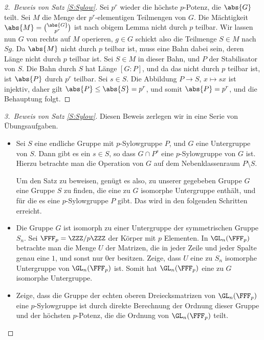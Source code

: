 \documentclass[12pt,a4paper,twoside]{article}
\begin{document}
\begin{proof}[2.\ Beweis von Satz \ref{S:Sylow}]
  Sei $p^r$ wieder die h\"ochste $p$-Potenz, die $\abs{G}$ teilt. Sei $M$ die
  Menge der $p^r$-elementigen Teilmengen von $G$. Die M\"achtigkeit
  $\abs{M}=\binom{\abs{G}}{p^r}$ ist nach obigem Lemma nicht durch $p$
  teilbar. Wir lassen nun $G$ von rechts auf $M$ operieren, $g\in G$ schickt
  also die Teilmenge $S\in M$ nach $Sg$. Da $\abs{M}$ nicht durch $p$ teilbar
  ist, muss eine Bahn dabei sein, deren L\"ange nicht durch $p$ teilbar ist.
  Sei $S\in M$ in dieser Bahn, und $P$ der Stabilisator von $S$. Die Bahn
  durch $S$ hat L\"ange $[G:P]$, und da das nicht durch $p$ teilbar ist, ist
  $\abs{P}$ durch $p^r$ teilbar. Sei $s\in S$. Die Abbildung $P\to S$,
  $x\mapsto sx$ ist injektiv, daher gilt $\abs{P}\le\abs{S}=p^r$, und somit
  $\abs{P}=p^r$, und die Behauptung folgt.
\end{proof}
\begin{proof}[3.\ Beweis von Satz \ref{S:Sylow}]
  Diesen Beweis zerlegen wir in eine Serie von \"Ubungsaufgaben.
  \begin{itemize}
  \item[(a)] Sei $S$ eine endliche Gruppe mit $p$-Sylowgruppe $P$, und $G$
    eine Untergruppe von $S$. Dann gibt es ein $s\in S$, so dass $G\cap P^s$
    eine $p$-Sylowgruppe von $G$ ist. Hierzu betrachte man die Operation von
    $G$ auf dem Nebenklassenraum $P\setminus S$.
    
    Um den Satz zu beweisen, gen\"ugt es also, zu unserer gegebeben Gruppe $G$
    eine Gruppe $S$ zu finden, die eine zu $G$ isomorphe Untergruppe
    enth\"alt, und f\"ur die es eine $p$-Sylowgruppe $P$ gibt. Das wird in den
    folgenden Schritten erreicht.
    
  \item[(b)] Die Gruppe $G$ ist isomorph zu einer Untergruppe der
    symmetrischen Gruppe $S_n$. Sei $\FFF_p=\ZZZ/p\ZZZ$ der K\"orper mit $p$
    Elementen. In $\GL_n(\FFF_p)$ betrachte man die Menge $U$ der Matrizen,
    die in jeder Zeile und jeder Spalte genau eine $1$, und sonst nur $0$er
    besitzen. Zeige, dass $U$ eine zu $S_n$ isomorphe Untergruppe von
    $\GL_n(\FFF_p)$ ist. Somit hat $\GL_n(\FFF_p)$ eine zu $G$ isomorphe
    Untergruppe.
  
  \item[(c)] Zeige, dass die Gruppe der echten oberen Dreiecksmatrizen von
    $\GL_n(\FFF_p)$ eine $p$-Sylowgruppe ist durch direkte Berechnung der
    Ordnung dieser Gruppe und der h\"ochsten $p$-Potenz, die die Ordnung von
    $\GL_n(\FFF_p)$ teilt.
  \end{itemize}
\end{proof}
\end{document}
